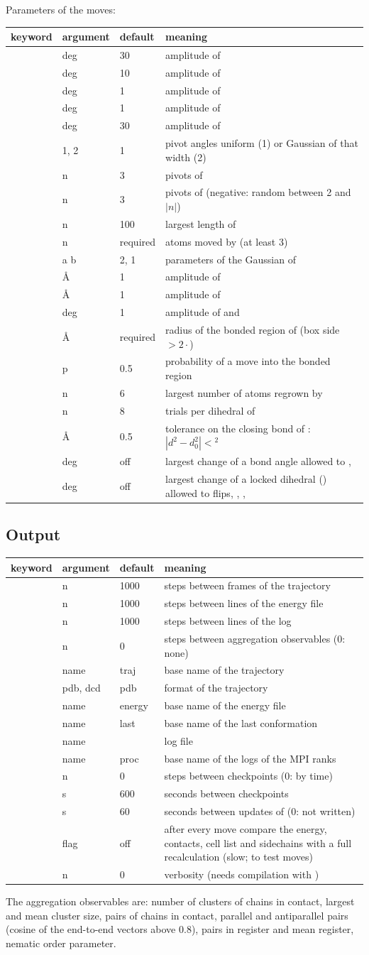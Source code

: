 \documentclass[11pt,a4paper]{article}
\newenvironment{keywords}
 {\begin{longtable}{>{\raggedright}p{0.2\textwidth}>{\raggedright}p{0.12\textwidth}>{\raggedright}p{0.14\textwidth}p{0.41\textwidth}}
  \toprule keyword & argument & default & meaning \\ \midrule \endhead
  \bottomrule \endfoot}
 {\end{longtable}}
\newcommand{\key}[4]{\kw{#1} & #2 & #3 & #4 \\}
\begin{document}
\noindent Parameters of the moves:
\begin{keywords}
\key{dw_flip}{deg}{30}{amplitude of \kw{flip}}
\key{dw_pivot}{deg}{10}{amplitude of \kw{pivot}}
\key{dw_mpivot}{deg}{1}{amplitude of \kw{mpivot}}
\key{dw_lpivot}{deg}{1}{amplitude of \kw{lpivot}}
\key{dw_mflip}{deg}{30}{amplitude of \kw{mflip}}
\key{randdw}{1, 2}{1}{pivot angles uniform (1) or Gaussian of that width (2)}
\key{nmul_mpivot}{n}{3}{pivots of \kw{mpivot}}
\key{nmul_lpivot}{n}{3}{pivots of \kw{lpivot} (negative: random between 2 and $|n|$)}
\key{nmul_mflip}{n}{100}{largest length of \kw{mflip}}
\key{nmul_local}{n}{required}{atoms moved by \kw{movebias} (at least 3)}
\key{bgs_a, bgs_b}{a b}{2, 1}{parameters of the Gaussian of \kw{movebias}}
\key{dx_com}{\AA}{1}{amplitude of \kw{movecom}}
\key{dx_clm}{\AA}{1}{amplitude of \kw{comcluster}}
\key{dtheta}{deg}{1}{amplitude of \kw{moverot} and \kw{rotcluster}}
\key{avb_rin}{\AA}{required}{radius of the bonded region of \kw{avbmc} (box side $>2\cdot$\kw{avb_rin})}
\key{avb_pin}{p}{0.5}{probability of a move into the bonded region}
\key{nmax_cbmc}{n}{6}{largest number of atoms regrown by \kw{cbmc}}
\key{ntrial_cbmc}{n}{8}{trials per dihedral of \kw{cbmc}}
\key{r_cloose}{\AA}{0.5}{tolerance on the closing bond of \kw{lpivot}: $|d^2-d_0^2|<$\kw{r_cloose}$^2$}
\key{a_cloose}{deg}{off}{largest change of a bond angle allowed to \kw{flip}, \kw{lpivot}}
\key{d_cloose}{deg}{off}{largest change of a locked dihedral (\kw{tomove 0}) allowed to flips, \kw{lpivot}, \kw{mflip}, \kw{backrub}}
\end{keywords}

\subsection{Output}
\begin{keywords}
\key{nprinttrj}{n}{1000}{steps between frames of the trajectory}
\key{nprinte}{n}{1000}{steps between lines of the energy file}
\key{nprintlog}{n}{1000}{steps between lines of the log}
\key{nprintobs}{n}{0}{steps between aggregation observables (0: none)}
\key{traj}{name}{traj}{base name of the trajectory}
\key{trjformat}{pdb, dcd}{pdb}{format of the trajectory}
\key{efile}{name}{energy}{base name of the energy file}
\key{lastp}{name}{last}{base name of the last conformation}
\key{logfile}{name}{\kw{montegrappa.log}}{log file}
\key{procfile}{name}{proc}{base name of the logs of the MPI ranks}
\key{ncheckpoint}{n}{0}{steps between checkpoints (0: by time)}
\key{tcheckpoint}{s}{600}{seconds between checkpoints}
\key{tmginfo}{s}{60}{seconds between updates of \kw{mginfo} (0: not written)}
\key{echeck}{flag}{off}{after every move compare the energy, contacts, cell list and sidechains with a full recalculation (slow; to test moves)}
\key{debug}{n}{0}{verbosity (needs compilation with \kw{-DDEBUG})}
\end{keywords}
The aggregation observables are: number of clusters of chains in contact,
largest and mean cluster size, pairs of chains in contact, parallel and
antiparallel pairs (cosine of the end-to-end vectors above 0.8), pairs in
register and mean register, nematic order parameter.
\end{document}
